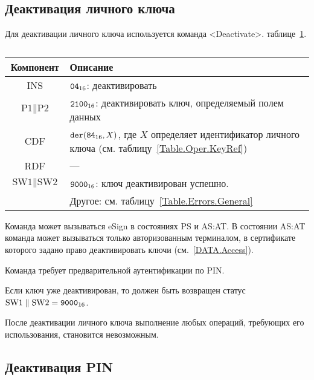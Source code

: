 \subsection{Деактивация личного ключа}
\label{Oper.Descr.DeactivateKey} 

Для деактивации личного ключа используется команда <Deactivate>.
 таблице~\ref{Table.Oper.DeactivateKeyCmd}.

\begin{table}[hbt]
\caption{}\label{Table.Oper.DeactivateKeyCmd}
\begin{tabular}{|c|p{14cm}|}
\hline
Компонент & Описание\\
\hline
\hline
INS & $\texttt{04}_{16}$: деактивировать\\
\hline
$\text{P1} \parallel \text{P2}$ & $\texttt{2100}_{16}$: 
деактивировать ключ, определяемый полем данных\\
\hline
CDF &  $\texttt{der}(\texttt{84}_{16}, X)$,   
где $X$ определяет идентификатор личного ключа 
(см. таблицу~\ref{Table.Oper.KeyRef})\\
\hline 
RDF & --- \\
\hline
$\text{SW1} \parallel \text{SW2}$ & 
$\texttt{9000}_{16}$: ключ деактивирован успешно. \\
  & Другое: см. таблицу~\ref{Table.Errors.General} \\
\hline
\end{tabular}
\end{table}

Команда может вызываться  eSign в состояниях 
PS и AS:AT. В состоянии AS:AT команда может вызываться 
только авторизованным терминалом, в сертификате которого задано право
деактивировать ключи (см.~\ref{DATA.Access}).

Команда требует предварительной аутентификации по PIN. 

Если ключ уже деактивирован, то должен быть возвращен статус
$\text{SW1} \parallel \text{SW2} = \texttt{9000}_{16}$.

После деактивации личного ключа выполнение любых операций, 
требующих его использования, становится невозможным.

\subsection{Деактивация PIN}
\label{Oper.Descr.DeactivatePIN} 

